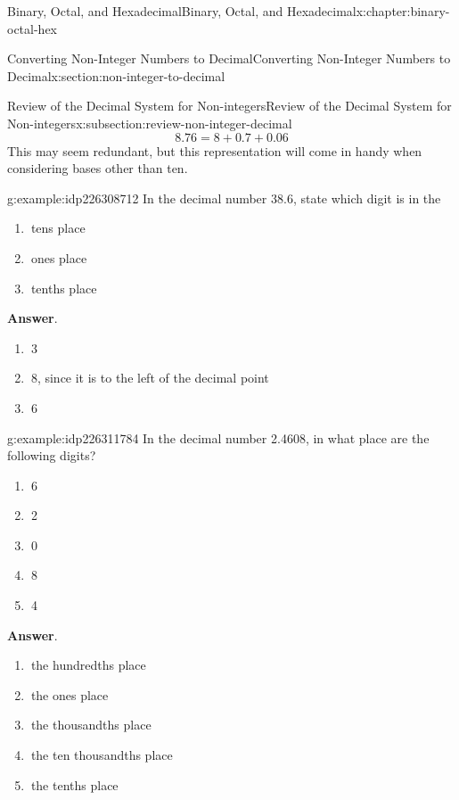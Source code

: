 \documentclass[twoside,10pt,]{book}
\newcommand{\blocktitlefont}{\relax}
\numberwithin{equation}{section}
\begin{document}
\begin{chapterptx}{Binary, Octal, and Hexadecimal}{}{Binary, Octal, and Hexadecimal}{}{}{x:chapter:binary-octal-hex}
\begin{sectionptx}{Converting Non-Integer Numbers to Decimal}{}{Converting Non-Integer Numbers to Decimal}{}{}{x:section:non-integer-to-decimal}
\begin{subsectionptx}{Review of the Decimal System for Non-integers}{}{Review of the Decimal System for Non-integers}{}{}{x:subsection:review-non-integer-decimal}
\begin{equation*}
8.76=8+0.7+0.06
\end{equation*}
This may seem redundant, but this representation will come in handy when considering bases other than ten.%
\begin{example}{}{g:example:idp226308712}%
In the decimal number 38.6, state which digit is in the %
\begin{enumerate}
\item{}\(\ \)tens place%
\item{}\(\ \)ones place%
\item{}\(\ \)tenths place%
\end{enumerate}
\par\smallskip%
\noindent\textbf{\blocktitlefont Answer}.\label{g:answer:idp226313320}{}\hypertarget{g:answer:idp226313320}{}\quad{}%
\begin{enumerate}
\item{}\(\ \)3%
\item{}\(\ \)8, since it is to the left of the decimal point%
\item{}\(\ \)6%
\end{enumerate}
\end{example}
\begin{example}{}{g:example:idp226311784}%
In the decimal number 2.4608, in what place are the following digits? %
\begin{enumerate}
\item{}\(\ \)6%
\item{}\(\ \)2%
\item{}\(\ \)0%
\item{}\(\ \)8%
\item{}\(\ \)4%
\end{enumerate}
\par\smallskip%
\noindent\textbf{\blocktitlefont Answer}.\label{g:answer:idp226052584}{}\hypertarget{g:answer:idp226052584}{}\quad{}%
\begin{enumerate}
\item{}\(\ \)the hundredths place%
\item{}\(\ \)the ones place%
\item{}\(\ \)the thousandths place%
\item{}\(\ \)the ten thousandths place%
\item{}\(\ \)the tenths place%
\end{enumerate}
\end{example}
\end{subsectionptx}
%
%
\typeout{************************************************}

\end{sectionptx}
\end{chapterptx}
\end{document}
